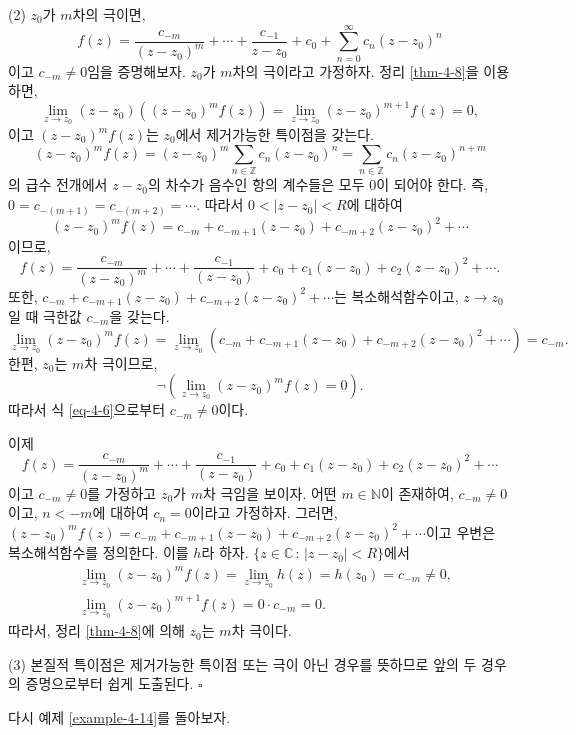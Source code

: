 (2) $z_0$가 $m$차의 극이면,
\[
f(z) = \dfrac{c_{-m}}{(z-z_0)^m} + \cdots + \dfrac{c_{-1}}{z-z_0}
+ c_0 + \sum_{n=0}^\infty c_n(z-z_0)^n
\]
이고 $c_{-m} \ne 0$임을 증명해보자.
$z_0$가 $m$차의 극이라고 가정하자.
정리 \ref{thm-4-8}을 이용하면,
\[
\lim_{z\to z_0} (z-z_0)\left( (z-z_0)^m f(z) \right)
= \lim_{z\to z_0} (z-z_0)^{m+1} f(z) =0,
\]
이고 $(z-z_0)^m f(z)$는 $z_0$에서 제거가능한 특이점을 갖는다.
\[
(z-z_0)^mf(z) = (z-z_0)^m \sum_{n\in\mathbb Z}c_n(z-z_0)^n
= \sum_{n\in\mathbb Z}c_n(z-z_0)^{n+m}
\]
의 급수 전개에서 $z-z_0$의 차수가 음수인 항의 계수들은 모두 $0$이 되어야 한다.
즉, $0 = c_{-(m+1)} = c_{-(m+2)} = \cdots$.
따라서 $0<|z-z_0|<R$에 대하여
\begin{equation}\label{eq-4-6}
(z-z_0)^mf(z) = c_{-m} + c_{-m+1}(z-z_0) + c_{-m+2}(z-z_0)^2 + \cdots
\end{equation}
이므로,
\[
f(z) = \dfrac{c_{-m}}{(z-z_0)^m} + \cdots + \dfrac{c_{-1}}{(z-z_0)}
+ c_0 + c_1(z-z_0) + c_2(z-z_0)^2 + \cdots.
\]
또한, 
$c_{-m} + c_{-m+1}(z-z_0) + c_{-m+2}(z-z_0)^2 + \cdots$는 
복소해석함수이고, $z\to z_0$일 때 극한값 $c_{-m}$을 갖는다.
\[
\lim_{z\to z_0} (z-z_0)^mf(z) 
= \lim_{z\to z_0}  \left( 
c_{-m} + c_{-m+1}(z-z_0) + c_{-m+2}(z-z_0)^2 + \cdots \right) = c_{-m}.
\]
한편, $z_0$는 $m$차 극이므로, 
\[
\neg \left( \lim_{z\to z_0} (z-z_0)^mf(z) =0 \right).
\]
따라서 식 \eqref{eq-4-6}으로부터 $c_{-m} \ne 0$이다.

이제 
\[
f(z) = \dfrac{c_{-m}}{(z-z_0)^m} + \cdots + \dfrac{c_{-1}}{(z-z_0)}
+ c_0 + c_1(z-z_0) + c_2(z-z_0)^2 + \cdots
\]
이고 $c_{-m} \ne 0$를 가정하고 $z_0$가 $m$차 극임을 보이자.
어떤 $m\in \mathbb N$이 존재하여,
$c_{-m} \ne 0$이고, $n<-m$에 대하여 $c_n=0$이라고 가정하자.
그러면, 
$(z-z_0)^mf(z) = c_{-m} + c_{-m+1}(z-z_0) + c_{-m+2}(z-z_0)^2 + \cdots$이고
우변은 복소해석함수를 정의한다. 이를 $h$라 하자.
$\{z \in \mathbb C\,:\, |z-z_0| <R\}$에서
\begin{align*}
& \lim_{z\to z_0} (z-z_0)^m f(z) = \lim_{z\to z_0} h(z) = h(z_0) = c_{-m} \ne0,\\
& \lim_{z\to z_0} (z-z_0)^{m+1}f(z) = 0 \cdot c_{-m} = 0.
\end{align*}
따라서, 정리 \ref{thm-4-8}에 의해 $z_0$는 $m$차 극이다.

(3) 본질적 특이점은 제거가능한 특이점 또는 극이 아닌 경우를 뜻하므로
앞의 두 경우의 증명으로부터 쉽게 도출된다.
\hfill $\square$

다시 예제 \ref{example-4-14}를 돌아보자.

